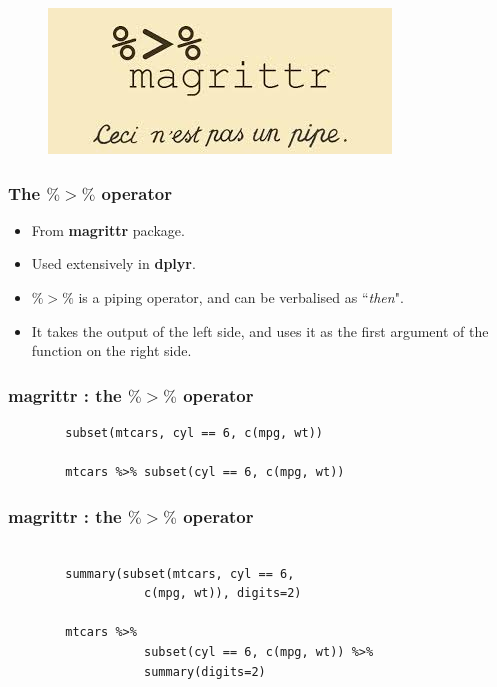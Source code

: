 \documentclass[MASTER.tex]{subfiles}
\begin{document}
	\begin{frame}
		\begin{figure}
\centering
\includegraphics[width=0.99\linewidth]{images/pipe2}

\end{figure}

	\end{frame}
	\begin{frame}[fragile]
		\frametitle{ The $\%>\%$ operator}
		\LARGE
		\begin{itemize}
		\item From \textbf{magrittr} package. 
		\item Used extensively in \textbf{dplyr}.
		\item $\%>\%$ is a piping operator, and can be verbalised as ``\textit{then}".
		\item It takes the output of the left side, and uses it as the first
		argument of the function on the right side.
		\end{itemize}
		\end{frame}
		\begin{frame}[fragile]
			\frametitle{magrittr :  the $\%>\%$ operator}
			\Large
		\begin{framed}
		\begin{verbatim}
		subset(mtcars, cyl == 6, c(mpg, wt))
		
		mtcars %>% subset(cyl == 6, c(mpg, wt))
		\end{verbatim}
	\end{framed}
	
\end{frame}
		\begin{frame}[fragile]
		\frametitle{magrittr :  the $\%>\%$ operator}
		\Large
		\begin{framed}
		\begin{verbatim}
			
		summary(subset(mtcars, cyl == 6, 
		           c(mpg, wt)), digits=2)
		  
		mtcars %>% 
				   subset(cyl == 6, c(mpg, wt)) %>% 
				   summary(digits=2)
		\end{verbatim}
		\end{framed}
	
	\end{frame}
\end{document}
